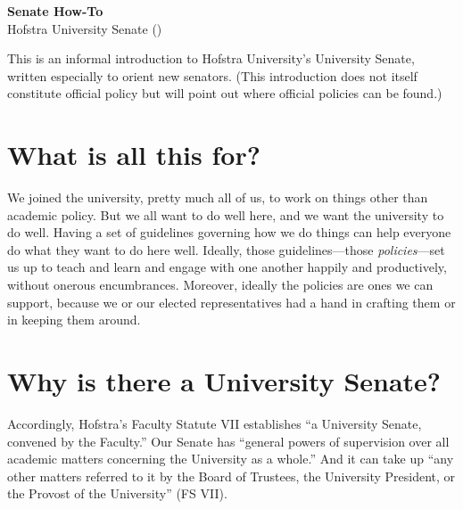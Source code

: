 \documentclass[12pt]{article}
\begin{document}
\thispagestyle{empty}



\begin{center}
  \textbf{\large Senate How-To} \\ Hofstra University Senate (\the\year) \\ %
\end{center}



\noindent This is an informal introduction to Hofstra University's University
Senate, written especially to orient new senators. (This introduction
does not itself constitute official policy but will point out where
official policies can be found.)



\begin{center}
\begin{minipage}[c]{4.25in} %
\tableofcontents
\end{minipage}
\end{center}



\section{What is all this for?}\label{what-is-all-this-for}

We joined the university, pretty much all of us, to work on things other
than academic policy. But we all want to do well here, and we want the
university to do well. Having a set of guidelines governing how we do
things can help everyone do what they want to do here well. Ideally,
those guidelines---those \emph{policies}---set us up to teach and learn
and engage with one another happily and productively, without onerous
encumbrances. Moreover, ideally the policies are ones we can support,
because we or our elected representatives had a hand in crafting them or
in keeping them around.

\section{Why is there a University
Senate?}\label{why-is-there-a-university-senate}

Accordingly, Hofstra's Faculty Statute VII establishes ``a University
Senate, convened by the Faculty.'' Our Senate has ``general powers of
supervision over all academic matters concerning the University as a
whole.'' And it can take up ``any other matters referred to it by the
Board of Trustees, the University President, or the Provost of the
University'' (FS VII).
\end{document}
